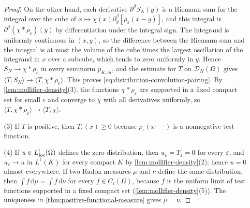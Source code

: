 \begin{proof}
On the other hand, each derivative $\partial^\beta S_N(y)$ is a Riemann sum for the integral over the cube of $x\mapsto\chi(x)\partial^\beta_y[\rho_\varepsilon(x-y)]$, and this integral is $\partial^\beta(\chi*\rho_\varepsilon)(y)$ by differentiation under the integral sign. The integrand is uniformly continuous in $(x,y)$, so the difference between the Riemann sum and the integral is at most the volume of the cube times the largest oscillation of the integrand in $x$ over a subcube, which tends to zero uniformly in $y$. Hence $S_N\to\chi*\rho_\varepsilon$ in every seminorm $p_{K,m}$, and the estimate for $T$ on $\mathcal D_K(\Omega)$ gives $\langle T,S_N\rangle\to\langle T,\chi*\rho_\varepsilon\rangle$. This proves \eqref{eq:distribution-convolution-pairing}. By \cref{lem:mollifier-density}(3), the functions $\chi*\rho_\varepsilon$ are supported in a fixed compact set for small $\varepsilon$ and converge to $\chi$ with all derivatives uniformly, so $\langle T,\chi*\rho_\varepsilon\rangle\to\langle T,\chi\rangle$.

(3) If $T$ is positive, then $T_\varepsilon(x)\geq0$ because $\rho_\varepsilon(x-\cdot)$ is a nonnegative test function.

(4) If $u\in L^1_{\mathrm{loc}}(\Omega)$ defines the zero distribution, then $u_\varepsilon=T_\varepsilon=0$ for every $\varepsilon$, and $u_\varepsilon\to u$ in $L^1(K)$ for every compact $K$ by \cref{lem:mollifier-density}(2); hence $u=0$ almost everywhere. If two Radon measures $\mu$ and $\nu$ define the same distribution, then $\int f\,\mathrm d\mu=\int f\,\mathrm d\nu$ for every $f\in C_c(\Omega)$, because $f$ is the uniform limit of test functions supported in a fixed compact set (\cref{lem:mollifier-density}(5)). The uniqueness in \cref{thm:positive-functional-measure} gives $\mu=\nu$.
\end{proof}

